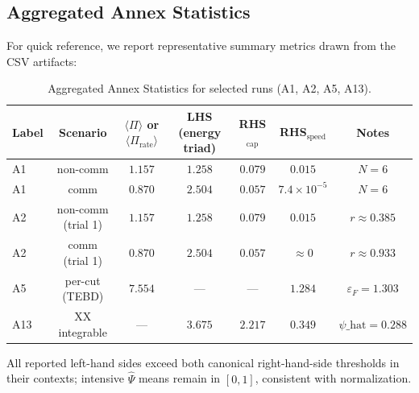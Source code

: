 \documentclass[10pt]{article}
\begin{document}
\subsection*{Aggregated Annex Statistics}
For quick reference, we report representative summary metrics drawn from the CSV artifacts:
\begin{table}[!ht]
\centering
\caption{Aggregated Annex Statistics for selected runs (A1, A2, A5, A13).}
\label{tab:annex-agg}
\begin{tabular}{@{}lcccccc@{}}
\toprule
Label & Scenario & $\langle\Pi\rangle$ or $\langle\Pi_{\mathrm{rate}}\rangle$ & LHS (energy triad) & RHS$_{\mathrm{cap}}$ & RHS$_{\mathrm{speed}}$ & Notes \\
\midrule
A1 & non-comm & $1.157$ & $1.258$ & $0.079$ & $0.015$ & $N{=}6$ \\
A1 & comm & $0.870$ & $2.504$ & $0.057$ & $7.4\times 10^{-5}$ & $N{=}6$ \\
A2 & non-comm (trial 1) & $1.157$ & $1.258$ & $0.079$ & $0.015$ & $r\approx0.385$ \\
A2 & comm (trial 1) & $0.870$ & $2.504$ & $0.057$ & $\approx 0$ & $r\approx0.933$ \\
A5 & per-cut (TEBD) & $7.554$ & — & — & $1.284$ & $\varepsilon_F{=}1.303$ \\
A13 & XX integrable & — & $3.675$ & $2.217$ & $0.349$ & $\psi\_\mathrm{hat}{=}0.288$ \\
\bottomrule
\end{tabular}
\end{table}
All reported left-hand sides exceed both canonical right-hand-side thresholds in their contexts; intensive $\widehat{\Psi}$ means remain in $[0,1]$, consistent with normalization.
\end{document}
